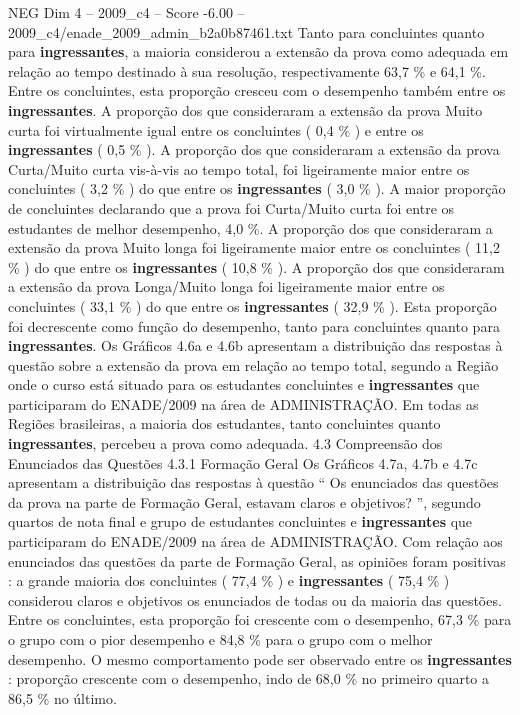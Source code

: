 \begin{textsample}{NEG Dim 4 – 2009\_c4 – Score -6.00 – 2009\_c4/enade\_2009\_admin\_b2a0b87461.txt}
Tanto para concluintes quanto para \textbf{ingressantes}, a maioria considerou a extensão da prova como adequada em relação ao tempo destinado à sua resolução, respectivamente 63,7 \% e 64,1 \%.
Entre os concluintes, esta proporção cresceu com o desempenho também entre os \textbf{ingressantes}.
A proporção dos que consideraram a extensão da prova Muito curta foi virtualmente igual entre os concluintes ( 0,4 \% ) e entre os \textbf{ingressantes} ( 0,5 \% ).
A proporção dos que consideraram a extensão da prova Curta/Muito curta vis-à-vis ao tempo total, foi ligeiramente maior entre os concluintes ( 3,2 \% ) do que entre os \textbf{ingressantes} ( 3,0 \% ).
A maior proporção de concluintes declarando que a prova foi Curta/Muito curta foi entre os estudantes de melhor desempenho, 4,0 \%.
A proporção dos que consideraram a extensão da prova Muito longa foi ligeiramente maior entre os concluintes ( 11,2 \% ) do que entre os \textbf{ingressantes} ( 10,8 \% ).
A proporção dos que consideraram a extensão da prova Longa/Muito longa foi ligeiramente maior entre os concluintes ( 33,1 \% ) do que entre os \textbf{ingressantes} ( 32,9 \% ).
Esta proporção foi decrescente como função do desempenho, tanto para concluintes quanto para \textbf{ingressantes}.
Os Gráficos 4.6a e 4.6b apresentam a distribuição das respostas à questão sobre a extensão da prova em relação ao tempo total, segundo a Região onde o curso está situado para os estudantes concluintes e \textbf{ingressantes} que participaram do ENADE/2009 na área de ADMINISTRAÇÃO.
Em todas as Regiões brasileiras, a maioria dos estudantes, tanto concluintes quanto \textbf{ingressantes}, percebeu a prova como adequada. 4.3 Compreensão dos Enunciados das Questões 4.3.1 Formação Geral Os Gráficos 4.7a, 4.7b e 4.7c apresentam a distribuição das respostas à questão “ Os enunciados das questões da prova na parte de Formação Geral, estavam claros e objetivos? ”, segundo quartos de nota final e grupo de estudantes concluintes e \textbf{ingressantes} que participaram do ENADE/2009 na área de ADMINISTRAÇÃO.
Com relação aos enunciados das questões da parte de Formação Geral, as opiniões foram positivas : a grande maioria dos concluintes ( 77,4 \% ) e \textbf{ingressantes} ( 75,4 \% ) considerou claros e objetivos os enunciados de todas ou da maioria das questões.
Entre os concluintes, esta proporção foi crescente com o desempenho, 67,3 \% para o grupo com o pior desempenho e 84,8 \% para o grupo com o melhor desempenho.
O mesmo comportamento pode ser observado entre os \textbf{ingressantes} : proporção crescente com o desempenho, indo de 68,0 \% no primeiro quarto a 86,5 \% no último.

\end{textsample}
